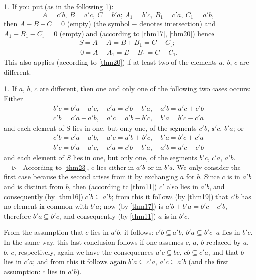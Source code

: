 \documentclass[leqno,hidelinks]{article}
\theoremstyle{definition}
\newtheorem{satz}{\protect\satzname}
\newtheorem*{zusatz}{\protect\zusatzname}
\newcommand{\satzname}{}
\newcommand{\zusatzname}{}
\renewcommand{\satzname}{\hspace{-4pt}.\ Satz}%
\renewcommand{\zusatzname}{Zusatz}%
\renewcommand{\satzname}{\hspace{-4pt}.\ Theorem}%
\renewcommand{\zusatzname}{Corollary}%
\newcommand\Beweis{\medskip \newline $ \phantom{'.'} \rhd \ $}%
\newcommand{\partof}{\subseteq}
\newcommand{\sref}[1]{\underline{\ref{#1}}}%
\begin{document}
\begin{paracol}{2}
\begin{zusatz}\label{corollary1}
If you put (as in the following \sref{thm25}):
\[
    A = c'b,\ B = a'c,\ C = b'a;\  A_1 = b'c,\ B_1 = c'a,\ C_1 = a'b,
\]
then $A - B - C = 0$ (empty) (the symbol $-$ denotes intersection) and
$A_1 - B_1 - C_1 = 0$ (empty) and (according to \sref{thm17}, \sref{thm20}) hence
\begin{gather*}
    S = A + A = B + B_1 = C + C_1; \\
    \,0 = A - A_1 = B - B_1 = C - C_1.
\end{gather*}
This also applies (according to \sref{thm20}) if at least two of the elements
$a$, $b$, $c$ are different.
\end{zusatz}

\begin{satz}\label{thm25}
If $a$, $b$, $c$ are different, then one and only one of the following two
cases occurs: Either
\begin{gather*}
    b'c = b'a + a'c, \quad c'a = c'b + b'a, \quad a'b = a'c + c'b \\
    c'b = c'a - a'b, \quad a'c = a'b - b'c, \quad b'a = b'c - c'a
\end{gather*}
and each element of S lies in one, but only one, of the segments
$c'b$, $a'c$, $b'a$; or
\begin{gather*}
    c'b = c'a + a'b, \quad a'c = a'b + b'c, \quad b'a = b'c + c'a \\
    b'c = b'a - a'c, \quad c'a = c'b - b'a, \quad a'b = a'c - c'b
\end{gather*}
and each element of $S$ lies in one, but only one, of the segments
$b'c$, $c'a$, $a'b$.
\Beweis
According to \sref{thm23}, $c$ lies either in $a'b$ or in $b'a$. We
only consider the first case because the second arises from it by
exchanging $a$ for $b$.
Since $c$ is in $a'b$ and is distinct from $b$, then
(according to \sref{thm11}) $c'$ also lies in $a'b$, and consequently
(by \sref{thm16}) $c'b \partof a'b$; from this it follows (by \sref{thm19})
that $c'b$ has no element in common with $b'a$; now (by \sref{thm17}) is
$a'b+b'a=b'c+c'b$, therefore $b'a \partof b'c$, and consequently
(by \sref{thm11}) $a$ is in $b'c$.

From the assumption that $c$ lies in $a'b$, it follows: $c'b \partof a'b$,
$b'a \partof b'c$, $a$ lies in $b'c$. In the same way, this last
conclusion follows if one assumes $c$, $a$, $b$ replaced by $a$, $b$, $c$,
respectively, again we have the consequences $a'c \partof bc$, $cb \partof c'a$,
and that $b$ lies in $c'a$; and from this it follows again $b'a \partof c'a$,
$a'c \partof a'b$ (and the first assumption: $c$ lies in $a'b$).


\end{satz}
\end{paracol}
\end{document}
